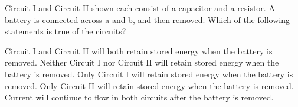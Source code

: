 \documentclass{../../oss-classkick-exam}
\begin{document}
\begin{multicols*}{2}
\begin{questions}
  \question Circuit I and Circuit II shown each consist of a capacitor and a
  resistor. A battery is connected across a and b, and then removed. Which of
  the following statements is true of the circuits?
  \begin{center}
    \hspace{.5in}
  \end{center}
  \begin{choices}
    \choice Circuit I and Circuit II will both retain stored energy when the
    battery is removed.
    \choice Neither Circuit I nor Circuit II will retain stored energy when
    the battery is removed.
    \choice Only Circuit I will retain stored energy when the battery is
    removed.
    \choice Only Circuit II will retain stored energy when the battery is
    removed.
    \choice Current will continue to flow in both circuits after the battery
    is removed.
  \end{choices}
  \vspace{.7in}
  

\end{questions}
\end{multicols*}
\end{document}

